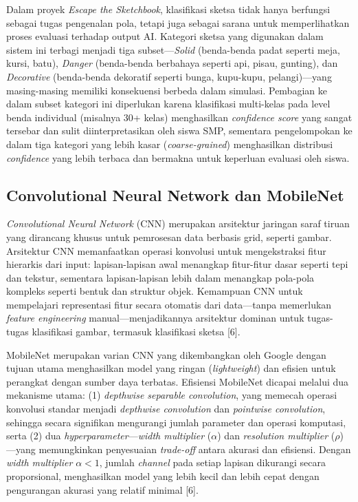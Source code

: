 Dalam proyek \textit{Escape the Sketchbook}, klasifikasi sketsa tidak hanya berfungsi sebagai tugas pengenalan pola, tetapi juga sebagai sarana untuk memperlihatkan proses evaluasi terhadap output AI. Kategori sketsa yang digunakan dalam sistem ini terbagi menjadi tiga subset—\textit{Solid} (benda-benda padat seperti meja, kursi, batu), \textit{Danger} (benda-benda berbahaya seperti api, pisau, gunting), dan \textit{Decorative} (benda-benda dekoratif seperti bunga, kupu-kupu, pelangi)—yang masing-masing memiliki konsekuensi berbeda dalam simulasi. Pembagian ke dalam subset kategori ini diperlukan karena klasifikasi multi-kelas pada level benda individual (misalnya 30+ kelas) menghasilkan \textit{confidence score} yang sangat tersebar dan sulit diinterpretasikan oleh siswa SMP, sementara pengelompokan ke dalam tiga kategori yang lebih kasar (\textit{coarse-grained}) menghasilkan distribusi \textit{confidence} yang lebih terbaca dan bermakna untuk keperluan evaluasi oleh siswa.

\subsection{Convolutional Neural Network dan MobileNet}
\label{subsec:cnn-mobilenet}

\textit{Convolutional Neural Network} (CNN) merupakan arsitektur jaringan saraf tiruan yang dirancang khusus untuk pemrosesan data berbasis grid, seperti gambar. Arsitektur CNN memanfaatkan operasi konvolusi untuk mengekstraksi fitur hierarkis dari input: lapisan-lapisan awal menangkap fitur-fitur dasar seperti tepi dan tekstur, sementara lapisan-lapisan lebih dalam menangkap pola-pola kompleks seperti bentuk dan struktur objek. Kemampuan CNN untuk mempelajari representasi fitur secara otomatis dari data—tanpa memerlukan \textit{feature engineering} manual—menjadikannya arsitektur dominan untuk tugas-tugas klasifikasi gambar, termasuk klasifikasi sketsa [6].

MobileNet merupakan varian CNN yang dikembangkan oleh Google dengan tujuan utama menghasilkan model yang ringan (\textit{lightweight}) dan efisien untuk perangkat dengan sumber daya terbatas. Efisiensi MobileNet dicapai melalui dua mekanisme utama: (1) \textit{depthwise separable convolution}, yang memecah operasi konvolusi standar menjadi \textit{depthwise convolution} dan \textit{pointwise convolution}, sehingga secara signifikan mengurangi jumlah parameter dan operasi komputasi, serta (2) dua \textit{hyperparameter}—\textit{width multiplier} ($\alpha$) dan \textit{resolution multiplier} ($\rho$)—yang memungkinkan penyesuaian \textit{trade-off} antara akurasi dan efisiensi. Dengan \textit{width multiplier} $\alpha < 1$, jumlah \textit{channel} pada setiap lapisan dikurangi secara proporsional, menghasilkan model yang lebih kecil dan lebih cepat dengan pengurangan akurasi yang relatif minimal [6].

